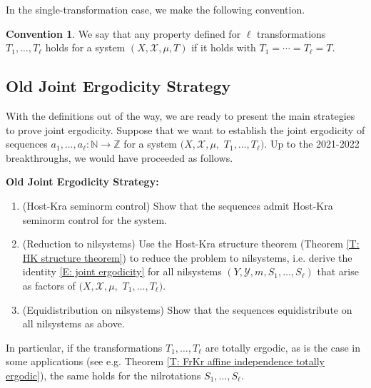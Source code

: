 \documentclass[11pt]{amsart}
\theoremstyle{definition}
\newtheorem{convention}{Convention}
\DeclareMathOperator*{\E}{\mathbb{E}}
\newcommand{\N}{{\mathbb N}}
\newcommand{\Z}{{\mathbb Z}}
\newcommand{\CX}{{\mathcal X}}
\newcommand{\CY}{{\mathcal Y}}
\newcommand{\norm}[1]{\left\Vert #1\right\Vert}
\newcommand{\nnorm}[1]{\lvert\!|\!| #1|\!|\!\rvert}
\newcommand{\1}{{\mathbf{1}}}
\newcommand{\rem}[1]{\left \{ #1 \right \}}
\begin{document}
In the single-transformation case, we make the following convention.
\begin{convention}
    We say that any property defined for $\ell$ transformations $T_1, \ldots, T_\ell$ holds for a system $(X, \CX, \mu, T)$ if it holds with $T_1 = \cdots = T_\ell = T$.
\end{convention}

\subsection{Old Joint Ergodicity Strategy}
With the definitions out of the way, we are ready to present the main strategies to prove joint ergodicity.
Suppose that we want to establish the joint ergodicity of sequences $a_1, \ldots, a_\ell:\N\to\Z$ for a system $(X, \CX, \mu,$\! $T_1, \ldots, T_\ell)$. Up to the 2021-2022 breakthroughs, we would have proceeded as follows.

\textbf{Old Joint Ergodicity Strategy:}
\begin{enumerate}
     \item (Host-Kra seminorm control) Show that the sequences admit Host-Kra seminorm control for the system.
    \item (Reduction to nilsystems) Use the Host-Kra structure theorem (Theorem \ref{T: HK structure theorem}) to reduce the problem to nilsystems, i.e. derive the identity \eqref{E: joint ergodicity} for all nilsystems $(Y, \CY, m, S_1, \ldots, S_\ell)$ that arise as factors of $(X, \CX, \mu,$\! $T_1, \ldots, T_\ell)$.
    \item (Equidistribution on nilsystems) Show that the sequences equidistribute on all nilsystems as above. 
\end{enumerate}
In particular, if the transformations $T_1, \ldots, T_\ell$ are totally ergodic, as is the case in some applications (see e.g. Theorem \ref{T: FrKr affine independence totally ergodic}), the same holds for the nilrotations $S_1, \ldots, S_\ell$.
\end{document}
